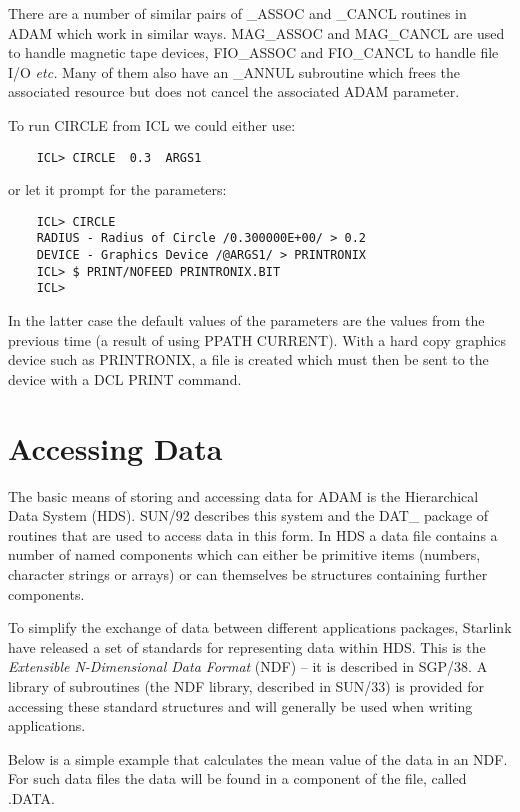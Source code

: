There are a number of similar pairs of \_ASSOC and \_CANCL routines in ADAM
which work in similar ways. MAG\_ASSOC and MAG\_CANCL are used to handle
magnetic tape devices, FIO\_ASSOC and FIO\_CANCL to handle file I/O {\em etc.}
Many of them also have an \_ANNUL subroutine which frees the associated
resource but does not cancel the associated ADAM parameter.

To run CIRCLE from ICL we could either use:

\begin{verbatim}
    ICL> CIRCLE  0.3  ARGS1
\end{verbatim}

or let it prompt for the parameters:

\begin{verbatim}
    ICL> CIRCLE
    RADIUS - Radius of Circle /0.300000E+00/ > 0.2
    DEVICE - Graphics Device /@ARGS1/ > PRINTRONIX
    ICL> $ PRINT/NOFEED PRINTRONIX.BIT
    ICL>                               
\end{verbatim}

In the latter case the default values of the parameters are the values from the
previous time (a result of using PPATH CURRENT). With a hard copy graphics
device such as PRINTRONIX, a file is created which must then be sent to
the device with a DCL PRINT command.
                                                                  
\section{Accessing Data}
\label{accdat}
The basic means of storing and accessing data for ADAM is the Hierarchical
Data System (HDS). SUN/92 describes this system
and the DAT\_ package of routines that are used to access data in this form.
In HDS a data file contains a number of named components which can
either be primitive items (numbers, character strings or arrays) or can
themselves be structures containing further components.

To simplify the exchange of data between different applications packages,
Starlink have released a set of standards for representing data within HDS.
This is the {\em Extensible N-Dimensional Data Format} (NDF) -- it is
described in SGP/38. A library of subroutines (the NDF library, described in 
SUN/33) is provided for accessing these standard structures and will generally
be used when writing applications.

Below is a simple example that calculates the mean value of the data in
an NDF. For such data files the data will be found in a component
of the file, called .DATA.

